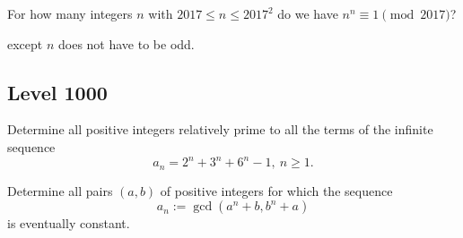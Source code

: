 \documentclass[11pt]{scrartcl}
\begin{document}
\begin{exercise}[PUMaC A 2016/N7]
	For how many integers $n$ with $2017 \le n \le 2017^2$ do we have $n^n \equiv 1 \pmod{2017}$? %
\end{exercise}

\begin{exercise}
	 except $n$ does not have to be odd. %
\end{exercise}

\subsection{Level 1000}

\begin{exercise}[IMO 2005/4]
	Determine all positive integers relatively prime to all the terms of the infinite sequence
	\[ a_n=2^n+3^n+6^n -1,\ n\geq 1. \]
\end{exercise}

\begin{exercise}[IMO 2024/2]
	Determine all pairs $(a,b)$ of positive integers for which the sequence
	\[a_n := \gcd(a^n+b,b^n+a)\]
	is eventually constant.
\end{exercise}
\end{document}
